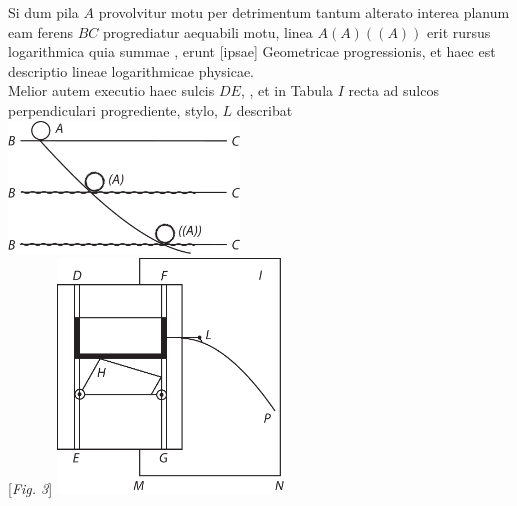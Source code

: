    \pstart
Si dum pila $\displaystyle A$ provolvitur motu per detrimentum tantum alterato
interea planum eam ferens $\displaystyle BC$ progrediatur aequabili motu,
linea $\displaystyle A(A)((A))$ erit rursus logarithmica quia summae
,
erunt [ipsae]
Geometricae progressionis, et haec est descriptio lineae logarithmicae physicae.
\\
\hspace*{7,5mm}
Melior autem executio haec 
sulcis $\displaystyle DE$, 
,
et in Tabula $\displaystyle I$ recta ad sulcos perpendiculari progrediente, stylo, $\displaystyle L$ describat
\pend
\vspace{1.5em}
   \pstart \noindent \centering \includegraphics[trim = 0mm -3mm 0mm 0mm, clip, width=0.46\textwidth]{images/lh03705_011r-d1.pdf}\\
    \centering{}
    [\textit{Fig. 3}] %
    \pend
    \newpage
    \pstart
    \noindent
    \centering
      \includegraphics[trim = 0mm 0mm 0mm 0mm, clip, width=0.45\textwidth]{images/lh03705_011r-d2.pdf}\\
